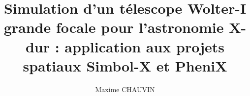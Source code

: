 \documentclass{book}
\title{\textbf{\large Simulation d'un télescope Wolter-I grande focale pour l'astronomie X-dur : application aux projets spatiaux Simbol-X et PheniX}}
\author{Maxime CHAUVIN}
\begin{document}
    \makeflyleaf
\end{document}
